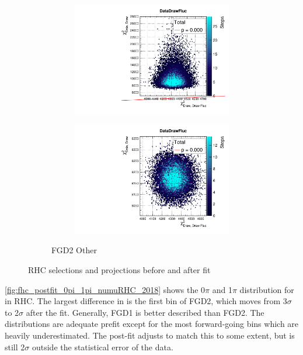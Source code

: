 \begin{figure}[h]
\begin{subfigure}[t]{\textwidth}
\begin{subfigure}[t]{0.24\textwidth}
			\includegraphics[width=\textwidth, trim={0mm 0mm 0mm 8mm}, clip,page=110]{figures/mach3/2018/data/2018a_FixedCov_RedCov_Mpi_Data_merge_PriorPred_procs}
		\end{subfigure}
		\begin{subfigure}[t]{0.24\textwidth}
			\includegraphics[width=\textwidth, trim={0mm 0mm 0mm 8mm}, clip,page=110]{figures/mach3/2018/data/2018a_FixedCov_RedCov_Mpi_Data_merge_PostPredStore_FullLLH_procs}
		\end{subfigure}
		\caption{FGD2 \numubar Other}
	\end{subfigure}
	\caption{RHC selections \pmu and \cosmu projections before and after fit}
	\label{fig:fhc_postfit_other_nubar_2018}
\end{figure}

\autoref{fig:fhc_postfit_0pi_1pi_numuRHC_2018} shows the 0$\pi$ and 1$\pi$ distribution for \numu in RHC. The largest difference in \pmu is the first bin of FGD2, which moves from 3$\sigma$ to 2$\sigma$ after the fit. Generally, FGD1 is better described than FGD2. The \cosmu distributions are adequate prefit except for the most forward-going bins which are heavily underestimated. The post-fit adjusts to match this to some extent, but is still 2$\sigma$ outside the statistical error of the data.


